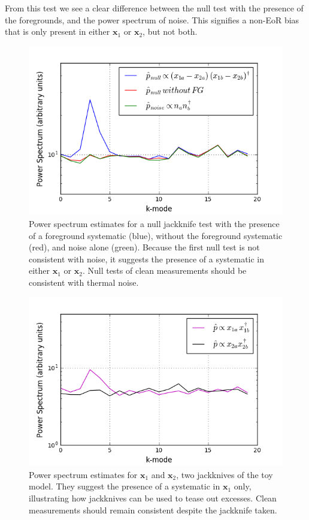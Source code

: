 \documentclass[preprint2,numberedappendix,tighten]{aastex6}  %
\begin{document}
From this test we see a clear difference between the null test with the presence of the foregrounds, and the power spectrum of noise. This signifies a non-EoR bias that is only present in either $\textbf{x}_{1}$ or $\textbf{x}_{2}$, but not both.

\begin{figure}
	\centering
	\includegraphics[trim={0.3cm 0.3cm 0.3cm 0.3cm},width=\columnwidth]{plots/toy_bias1.png}
	\caption{Power spectrum estimates for a null jackknife test with the presence of a foreground systematic (blue), without the foreground systematic (red), and noise alone (green). Because the first null test is not consistent with noise, it suggests the presence of a systematic in either $\textbf{x}_{1}$ or $\textbf{x}_{2}$. Null tests of clean measurements should be consistent with thermal noise.}
	\label{fig:toy_bias1}
\end{figure}

\begin{figure}
	\centering
	\includegraphics[trim={0.3cm 0.3cm 0.3cm 0.3cm},width=\columnwidth]{plots/toy_bias2.png}
	\caption{Power spectrum estimates for $\textbf{x}_{1}$ and $\textbf{x}_{2}$, two jackknives of the toy model. They suggest the presence of a systematic in $\textbf{x}_{1}$ only, illustrating how jackknives can be used to tease out excesses. Clean measurements should remain consistent despite the jackknife taken.}
	\label{fig:toy_bias2}
\end{figure}
\end{document}
